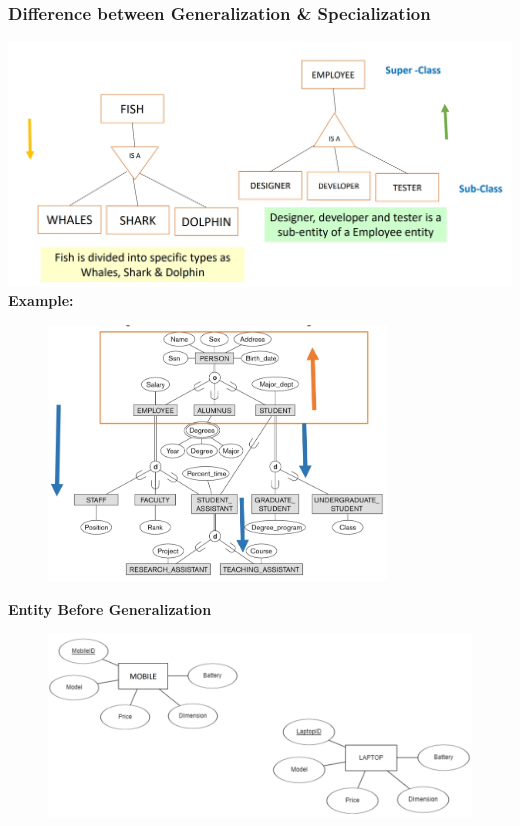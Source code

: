 \documentclass[a4paper, 12pt]{article}
\begin{document}
       \subsubsection{Difference between Generalization \& Specialization}
       \includegraphics[width=\textwidth]{chapter2c_2.png}
       \textbf{Example:} %
       \begin{figure}[H]
        \includegraphics[width=0.8\textwidth]{chapter2c_3.png}
       \end{figure}

       \vspace{3cm}

       \textbf{Entity Before Generalization} %
       \begin{figure}[H]
        \includegraphics[width=\textwidth]{chapter2c_4.png}
       \end{figure}
\end{document}
